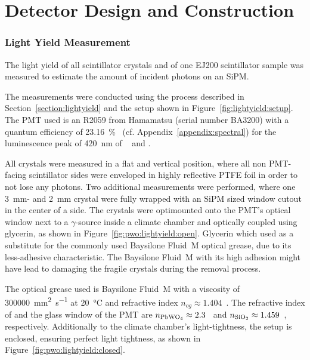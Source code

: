 \section{Detector Design and Construction}\label{section:setup}

\subsubsection{Light Yield Measurement}\label{section:pwo:lightyield} 
The light yield of all  scintillator crystals and of one EJ200 scintillator sample was measured to estimate the amount of incident photons on an SiPM.

The measurements were conducted using the process described in Section~\ref{section:lightyield} and the setup shown in Figure~\ref{fig:lightyield:setup}.
The PMT used is an R2059 from Hamamatsu (serial number BA3200) with a quantum efficiency of \SI{23.16}{\percent}~\cite{datasheet:hamamatsu_R2059} (cf. Appendix~\ref{appendix:spectral}) for the luminescence peak of \SI{420}{\nano\meter} of ~\cite{cms:tdr} and .

All  crystals were measured in a flat and vertical position, where all non PMT-facing scintillator sides were enveloped in highly reflective PTFE foil in order to not lose any photons.
Two additional measurements were performed, where one \SI{3}{\milli\meter}- and \SI{2}{\milli\meter} crystal were fully wrapped with an SiPM sized window cutout in the center of a side.
The  crystals were optimounted onto the PMT's optical window next to a  $\gamma$-source inside a climate chamber and optically coupled using glycerin, as shown in Figure~\ref{fig:pwo:lightyield:open}.
Glycerin which used as a substitute for the commonly used Baysilone\textsuperscript{{\textregistered}} Fluid~M optical grease, due to its less-adhesive characteristic.
The Baysilone\textsuperscript{{\textregistered}} Fluid~M with its high adhesion might have lead to damaging the fragile crystals during the removal process.


The optical grease used is Baysilone\textsuperscript{{\textregistered}} Fluid~M with a viscosity of \SI{300000}{\milli\meter^2\per\second} at \SI{20}{\celsius} and refractive index $n_{og}\approx1.404$~\cite{bayer:baysilone}.
The refractive index of  and the  glass window of the \gls{PMT} are $n_{\ce{PbWO4}}\approx2.3$~\cite{cms:tdr} and $n_{\ce{SiO2}}\approx1.459$~\cite{Malitson:65}, respectively.
Additionally to the climate chamber's light-tightness, the setup is enclosed, ensuring perfect light tightness, as shown in Figure~\ref{fig:pwo:lightyield:closed}.

